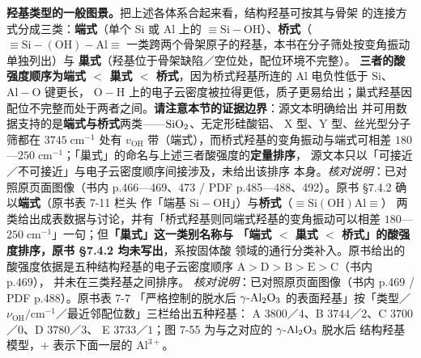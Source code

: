 \begin{obs}
\textbf{羟基类型的一般图景。}把上述各体系合起来看，结构羟基可按其与骨架
的连接方式分成三类：\textbf{端式}（单个 $\mathrm{Si}$ 或 $\mathrm{Al}$
上的 $\equiv\!\mathrm{Si{-}OH}$）、\textbf{桥式}（$\equiv\!\mathrm{Si{-}(OH){-}Al}\equiv$
一类跨两个骨架原子的羟基，本书在分子筛处按变角振动单独列出）与
\textbf{巢式}（羟基位于骨架缺陷／空位处，配位环境不完整）。
\textbf{三者的酸强度顺序为端式 $<$ 巢式 $<$ 桥式}，因为桥式羟基所连的
$\mathrm{Al}$ 电负性低于 $\mathrm{Si}$、$\mathrm{Al{-}O}$ 键更长，
$\mathrm{O{-}H}$ 上的电子云密度被拉得更低，质子更易给出；巢式羟基因
配位不完整而处于两者之间。\textbf{请注意本节的证据边界}：源文本明确给出
并可用数据支持的是\textbf{端式与桥式}两类——$\ce{SiO2}$、无定形硅酸铝、
X 型、Y 型、丝光型分子筛都在 $3745\;\mathrm{cm^{-1}}$ 处有
$v_{\mathrm{OH}}$ 带（端式），而桥式羟基的变角振动与端式可相差
$180$—$250\;\mathrm{cm^{-1}}$；「巢式」的命名与上述三者酸强度的\textbf{定量排序}，
源文本只以「可接近／不可接近」与电子云密度顺序间接涉及，未给出该排序
本身。\emph{核对说明}：已对照原页面图像（书内 p.466—469、473 /
PDF p.485—488、492）。原书 §7.4.2 确以\textbf{端式}（原书表 7-11 栏头
作「端基 $\mathrm{Si{-}OH}$」）与\textbf{桥式}（$\equiv\!\mathrm{Si(OH)Al}\equiv$）
两类给出成表数据与讨论，并有「桥式羟基则同端式羟基的变角振动可以相差
$180$—$250\;\mathrm{cm^{-1}}$」一句；但\textbf{「巢式」这一类别名称与
「端式 $<$ 巢式 $<$ 桥式」的酸强度排序，原书 §7.4.2 均未写出}，系按固体酸
领域的通行分类补入。原书给出的酸强度依据是五种结构羟基的电子云密度顺序
$\mathrm{A}>\mathrm{D}>\mathrm{B}>\mathrm{E}>\mathrm{C}$（书内 p.469），
并未在三类羟基之间排序。
\emph{核对说明}：已对照原页面图像（书内 p.469 / PDF p.488）。原书表 7-7
「严格控制的脱水后 $\gamma\text{-}\ce{Al2O3}$ 的表面羟基」按「类型／
$\nu_{\mathrm{OH}}/\mathrm{cm^{-1}}$／最近邻配位数」三栏给出五种羟基：
A $3800$／$4$、B $3744$／$2$、C $3700$／$0$、D $3780$／$3$、
E $3733$／$1$；图 7-55 为与之对应的 $\gamma\text{-}\ce{Al2O3}$ 脱水后
结构羟基模型，$+$ 表示下面一层的 $\mathrm{Al^{3+}}$。
\end{obs}

